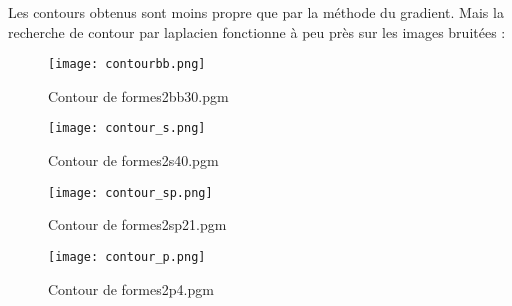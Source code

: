 \documentclass{article}
\begin{document}
Les contours obtenus sont moins propre que par la méthode du gradient. Mais la recherche de contour par laplacien fonctionne à peu près sur les images bruitées : 


\begin{figure}[h]
\texttt{[image: contourbb.png]}
\caption{Contour de formes2bb30.pgm}
\end{figure}

\begin{figure}[h]
\texttt{[image: contour\_s.png]}
\caption{Contour de formes2s40.pgm}
\end{figure}
\begin{figure}[h]
\texttt{[image: contour\_sp.png]}
\caption{Contour de formes2sp21.pgm}
\end{figure}
\begin{figure}[h]
\texttt{[image: contour\_p.png]}
\caption{Contour de formes2p4.pgm}
\end{figure}
\end{document}
